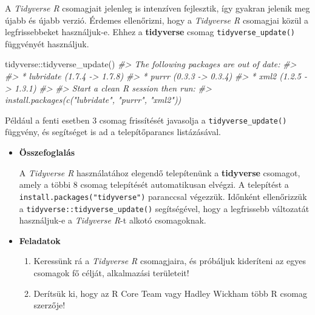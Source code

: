 \documentclass[
]{book}
\newenvironment{Shaded}{\begin{snugshade}}{\end{snugshade}}
\newcommand{\CommentTok}[1]{\textcolor[rgb]{0.56,0.35,0.01}{\textit{#1}}}
\newcommand{\FunctionTok}[1]{\textcolor[rgb]{0.00,0.00,0.00}{#1}}
\newcommand{\NormalTok}[1]{#1}
\newcommand{\SpecialCharTok}[1]{\textcolor[rgb]{0.00,0.00,0.00}{#1}}
\providecommand{\tightlist}{%
  \setlength{\itemsep}{0pt}\setlength{\parskip}{0pt}}
\newenvironment{rmdblock}[1]
  {\begin{shaded*}
  \begin{itemize}
  \renewcommand{\labelitemi}{
    \raisebox{-.7\height}[0pt][0pt]{
      {\setkeys{Gin}{width=3em,keepaspectratio}\texttt{[image: images/\#1]}}
    }
  }
  \item
  }
  {
  \end{itemize}
  \end{shaded*}
  }
\newenvironment{rmdsummary}
  {\begin{rmdblock}{summary}}
  {\end{rmdblock}}
\newenvironment{rmdexercise}
  {\begin{rmdblock}{exercise}}
  {\end{rmdblock}}
\begin{document}
A \emph{Tidyverse R} csomagjait jelenleg is intenzíven fejlesztik, így gyakran jelenik meg újabb és újabb verzió. Érdemes ellenőrizni, hogy a \emph{Tidyverse R} csomagjai közül a legfrissebbeket használjuk-e. Ehhez a \textbf{tidyverse} csomag \texttt{tidyverse\_update()} függvényét használjuk.

\begin{Shaded}
\begin{Highlighting}[]
\NormalTok{tidyverse}\SpecialCharTok{::}\FunctionTok{tidyverse\_update}\NormalTok{()}
\CommentTok{\#\textgreater{} The following packages are out of date:}
\CommentTok{\#\textgreater{} }
\CommentTok{\#\textgreater{} * lubridate (1.7.4 {-}\textgreater{} 1.7.8)}
\CommentTok{\#\textgreater{} * purrr     (0.3.3 {-}\textgreater{} 0.3.4)}
\CommentTok{\#\textgreater{} * xml2      (1.2.5 {-}\textgreater{} 1.3.1)}
\CommentTok{\#\textgreater{} }
\CommentTok{\#\textgreater{} Start a clean R session then run:}
\CommentTok{\#\textgreater{} install.packages(c("lubridate", "purrr", "xml2"))}
\end{Highlighting}
\end{Shaded}

Például a fenti esetben 3 csomag frissítését javasolja a \texttt{tidyverse\_update()} függvény, és segítséget is ad a telepítőparancs listázásával.

\begin{rmdsummary}
\textbf{Összefoglalás}

A \emph{Tidyverse R} használatához elegendő telepítenünk a
\textbf{tidyverse} csomagot, amely a többi 8 csomag telepítését
automatikusan elvégzi. A telepítést a
\texttt{install.packages("tidyverse")} paranccsal végezzük. Időnként
ellenőrizzük a \texttt{tidyverse::tidyverse\_update()} segítségével,
hogy a legfrissebb változatát használjuk-e a \emph{Tidyverse R}-t alkotó
csomagoknak.
\end{rmdsummary}

\begin{rmdexercise}
\textbf{Feladatok}

\begin{enumerate}
\def\labelenumi{\arabic{enumi}.}
\tightlist
\item
  Keressünk rá a \emph{Tidyverse R} csomagjaira, és próbáljuk kideríteni az egyes csomagok fő célját, alkalmazási területeit!
\item
  Derítsük ki, hogy az R Core Team vagy Hadley Wickham több R csomag szerzője!
\end{enumerate}
\end{rmdexercise}
\end{document}
